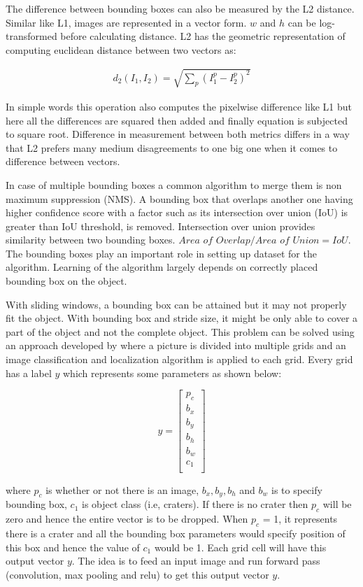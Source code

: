\documentclass[11pt]{article}
\begin{document}
The difference between bounding boxes can also be measured by the L2 distance. Similar like L1, images are represented in a vector form. $w$ and $h$ can be log-transformed before calculating distance. L2 has the geometric representation of computing euclidean distance between two vectors as:

\begin{align*}
d_2 (I_1, I_2) = \sqrt{\sum_{p} \left( I^p_1 - I^p_2 \right)^2}
\end{align*}
 
In simple words this operation also computes the pixelwise difference like L1 but here all the differences are squared then added and finally equation is subjected to square root. Difference in measurement between both metrics differs in a way that L2 prefers many medium disagreements to one big one when it comes to difference between vectors.
 
In case of multiple bounding boxes a common algorithm to merge them is non maximum suppression (NMS). A bounding box that overlaps another one having higher confidence score with a factor such as its intersection over union (IoU) is greater than IoU threshold, is removed. Intersection over union provides similarity between two bounding boxes. ${\textit{Area of Overlap}} /{\textit{Area of Union}} = IoU
$. The bounding boxes play an important role in setting up dataset for the algorithm. Learning of the algorithm largely depends on correctly placed bounding box on the object.

With sliding windows, a bounding box can be attained but it may not properly fit the object. With bounding box and stride size, it might be only able to cover a part of the object and not the complete object. This problem can be solved using an approach developed by \cite{redmon_you_2016} where a picture is divided into multiple grids and an image classification and localization algorithm is applied to each grid. Every grid has a label $y$ which represents some parameters as shown below:

$$
y =
\begin{bmatrix}
p_c\\
b_x\\
b_y\\
b_h\\
b_w\\
c_1\\
\end{bmatrix}
$$

where $p_c$ is whether or not there is an image, $b_x, b_y, b_h$ and $b_w$ is to specify bounding box, $c_1$ is object class (i.e, craters). If there is no crater then $p_c$ will be zero and hence the entire vector is to be dropped. When $p_c$ = 1, it represents there is a crater and all the bounding box parameters would specify position of this box and hence the value of $c_1$ would be 1. Each grid cell will have this output vector $y$. The idea is to feed an input image and run forward pass (convolution, max pooling and relu) to get this output vector $y$.
\end{document}
